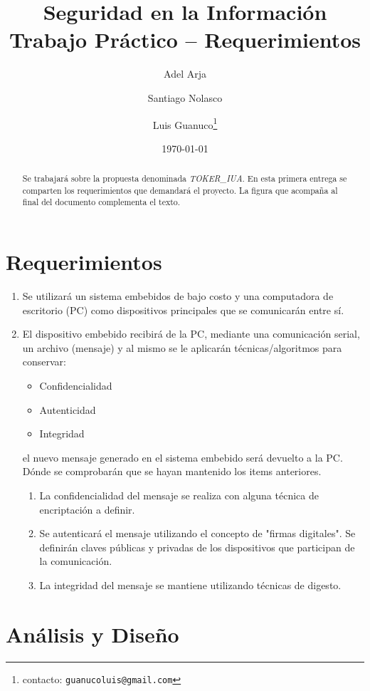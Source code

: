 \documentclass[oneside,11pt,a4paper,spanish]{article}
\title{Seguridad en la Información\\
\normalsize{Trabajo Práctico -- Requerimientos}}
\author{
Adel Arja \and
Santiago Nolasco \and
Luis Guanuco\footnote{contacto: \texttt{guanucoluis@gmail.com}}}
\date{\today}
\begin{document}
\maketitle

\begin{abstract}
  Se trabajará sobre la propuesta denominada \emph{TOKER\_IUA}. En
  esta primera entrega se comparten los requerimientos que demandará
  el proyecto. La figura que acompaña al final del documento
  complementa el texto.
\end{abstract}

\section{Requerimientos}

\begin{enumerate}
\item Se utilizará un sistema embebidos de bajo costo y una computadora
de escritorio (PC) como dispositivos principales que se comunicarán
entre sí.
\item El dispositivo embebido recibirá de la PC, mediante una
comunicación serial, un archivo (mensaje) y al mismo se le aplicarán
técnicas/algoritmos para conservar:
\begin{itemize}
\item Confidencialidad
\item Autenticidad
\item Integridad
\end{itemize}
el nuevo mensaje generado en el sistema embebido será devuelto a la
PC. Dónde se comprobarán que se hayan mantenido los items anteriores.
\begin{enumerate}
\item La confidencialidad del mensaje se realiza con alguna técnica de
encriptación a definir.
\item Se autenticará el mensaje utilizando el concepto de "firmas
digitales". Se definirán claves públicas y privadas de los
dispositivos que participan de la comunicación.
\item La integridad del mensaje se mantiene utilizando técnicas de
digesto.
\end{enumerate}
\end{enumerate}

\newpage{}
\section{Análisis y Diseño}
\end{document}
